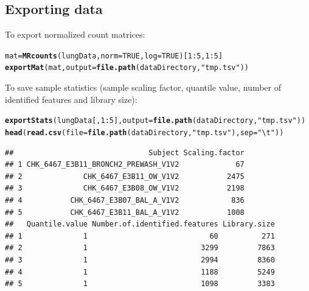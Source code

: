 \documentclass[a4paper,11pt]{article}\usepackage[]{graphicx}\usepackage[]{color}
\makeatletter
\newcommand{\hlnum}[1]{\textcolor[rgb]{0.686,0.059,0.569}{#1}}%
\newcommand{\hlstr}[1]{\textcolor[rgb]{0.192,0.494,0.8}{#1}}%
\newcommand{\hlopt}[1]{\textcolor[rgb]{0,0,0}{#1}}%
\newcommand{\hlstd}[1]{\textcolor[rgb]{0.345,0.345,0.345}{#1}}%
\newcommand{\hlkwb}[1]{\textcolor[rgb]{0.69,0.353,0.396}{#1}}%
\newcommand{\hlkwc}[1]{\textcolor[rgb]{0.333,0.667,0.333}{#1}}%
\newcommand{\hlkwd}[1]{\textcolor[rgb]{0.737,0.353,0.396}{\textbf{#1}}}%
\newenvironment{kframe}{%
 \def\at@end@of@kframe{}%
 \ifinner\ifhmode%
  \def\at@end@of@kframe{\end{minipage}}%
  \begin{minipage}{\columnwidth}%
 \fi\fi%
 \def\FrameCommand##1{\hskip\@totalleftmargin \hskip-\fboxsep
 \colorbox{shadecolor}{##1}\hskip-\fboxsep
     \hskip-\linewidth \hskip-\@totalleftmargin \hskip\columnwidth}%
 \MakeFramed {\advance\hsize-\width
   \@totalleftmargin\z@ \linewidth\hsize
   \@setminipage}}%
 {\par\unskip\endMakeFramed%
 \at@end@of@kframe}
\newenvironment{knitrout}{}{} %
\makeatother
\begin{document}
\subsection{Exporting data}
To export normalized count matrices:
\begin{knitrout}
\color{fgcolor}\begin{kframe}
\begin{alltt}
\hlstd{mat} \hlkwb{=} \hlkwd{MRcounts}\hlstd{(lungData,} \hlkwc{norm} \hlstd{=} \hlnum{TRUE}\hlstd{,} \hlkwc{log} \hlstd{=} \hlnum{TRUE}\hlstd{)[}\hlnum{1}\hlopt{:}\hlnum{5}\hlstd{,} \hlnum{1}\hlopt{:}\hlnum{5}\hlstd{]}
\hlkwd{exportMat}\hlstd{(mat,} \hlkwc{output} \hlstd{=} \hlkwd{file.path}\hlstd{(dataDirectory,} \hlstr{"tmp.tsv"}\hlstd{))}
\end{alltt}
\end{kframe}
\end{knitrout}


\noindent
To save sample statistics (sample scaling factor, quantile value, number of identified features and library size):
\begin{knitrout}
\color{fgcolor}\begin{kframe}
\begin{alltt}
\hlkwd{exportStats}\hlstd{(lungData[,} \hlnum{1}\hlopt{:}\hlnum{5}\hlstd{],} \hlkwc{output} \hlstd{=} \hlkwd{file.path}\hlstd{(dataDirectory,} \hlstr{"tmp.tsv"}\hlstd{))}
\hlkwd{head}\hlstd{(}\hlkwd{read.csv}\hlstd{(}\hlkwc{file} \hlstd{=} \hlkwd{file.path}\hlstd{(dataDirectory,} \hlstr{"tmp.tsv"}\hlstd{),} \hlkwc{sep} \hlstd{=} \hlstr{"\textbackslash{}t"}\hlstd{))}
\end{alltt}
\begin{verbatim}
##                               Subject Scaling.factor
## 1 CHK_6467_E3B11_BRONCH2_PREWASH_V1V2             67
## 2              CHK_6467_E3B11_OW_V1V2           2475
## 3              CHK_6467_E3B08_OW_V1V2           2198
## 4           CHK_6467_E3B07_BAL_A_V1V2            836
## 5           CHK_6467_E3B11_BAL_A_V1V2           1008
##   Quantile.value Number.of.identified.features Library.size
## 1              1                            60          271
## 2              1                          3299         7863
## 3              1                          2994         8360
## 4              1                          1188         5249
## 5              1                          1098         3383
\end{verbatim}
\end{kframe}
\end{knitrout}
\end{document}
